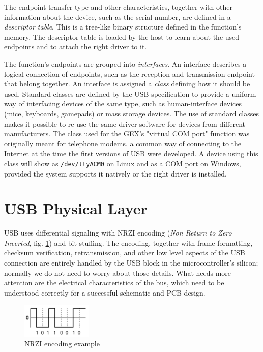 The endpoint transfer type and other characteristics, together with other information about the device, such as the serial number, are defined in a \textit{descriptor table}. This is a tree-like binary structure defined in the function's memory. The descriptor table is loaded by the host to learn about the used endpoints and to attach the right driver to it.

The function's endpoints are grouped into \textit{interfaces}. An interface describes a logical connection of endpoints, such as the reception and transmission endpoint that belong together. An interface is assigned a \textit{class} defining how it should be used. Standard classes are defined by the USB specification to provide a uniform way of interfacing devices of the same type, such as human-interface devices (mice, keyboards, gamepads) or mass storage devices. The use of standard classes makes it possible to re-use the same driver software for devices from different manufacturers. The class used for the GEX's "virtual COM port" function was originally meant for telephone modems, a common way of connecting to the Internet at the time the first versions of USB were developed. A device using this class will show as \verb|/dev/ttyACM0| on Linux and as a COM port on Windows, provided the system supports it natively or the right driver is installed.



\newpage


\section{USB Physical Layer}

USB uses differential signaling with NRZI encoding (\textit{Non Return to Zero Inverted}, fig. \ref{fig:nrzi}) and bit stuffing. The encoding, together with frame formatting, checksum verification, retransmission, and other low level aspects of the USB connection are entirely handled by the USB block in the microcontroller's silicon; normally we do not need to worry about those details. What needs more attention are the electrical characteristics of the bus, which need to be understood correctly for a successful schematic and PCB design.

\begin{figure}
	\centering
	\includegraphics[width=0.3\textwidth]{img/usb-nrzi-diagram.png}
	\caption{\label{fig:nrzi}NRZI encoding example}
\end{figure}

